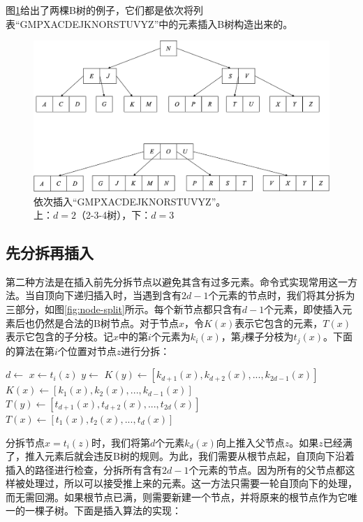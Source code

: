 \documentclass{ctexart}
\begin{document}
图\ref{fig:btree-insert-fp}给出了两棵B树的例子，它们都是依次将列表``GMPXACDEJKNORSTUVYZ''中的元素插入B树构造出来的。

\begin{figure}[htbp]
  \centering
  \includegraphics[scale=0.4]{img/btree-insert-fp.png}
  \captionsetup{justification=centering}
  \caption{依次插入``GMPXACDEJKNORSTUVYZ''。\\
上：$d = 2$（2-3-4树），下：$d = 3$}
  \label{fig:btree-insert-fp}
\end{figure}

\subsection{先分拆再插入}

第二种方法是在插入前先分拆节点以避免其含有过多元素。命令式实现常用这一方法。当自顶向下递归插入时，当遇到含有$2d - 1$个元素的节点时，我们将其分拆为三部分，如图\ref{fig:node-split}所示。每个新节点都只含有$d - 1$个元素，即使插入元素后也仍然是合法的B树节点。对于节点$x$，令$K(x)$表示它包含的元素，$T(x)$表示它包含的子分枝。记$x$中的第$i$个元素为$k_i(x)$，第$j$棵子分枝为$t_j(x)$。下面的算法在第$i$个位置对节点$z$进行分拆：

\begin{algorithmic}[1]
  \State $d \gets$ 
  \State $x \gets t_i(z)$
  \State $y \gets$ 
  \State $K(y) \gets [k_{d + 1}(x), k_{d + 2}(x), ..., k_{2d - 1}(x)]$
  \State $K(x) \gets [k_1(x), k_2(x), ..., k_{d-1}(x)]$
    \State $T(y) \gets [t_{d + 1}(x), t_{d + 2}(x), ..., t_{2d}(x)]$
    \State $T(x) \gets [t_1(x), t_2(x), ..., t_d(x)]$
  \EndIf
  \State {}
  \State {}
\EndProcedure
\end{algorithmic}

分拆节点$x = t_i(z)$时，我们将第$d$个元素$k_d(x)$向上推入父节点$z$。如果$z$已经满了，推入元素后就会违反B树的规则。为此，我们需要从根节点起，自顶向下沿着插入的路径进行检查，分拆所有含有$2d - 1$个元素的节点。因为所有的父节点都这样被处理过，所以可以接受推上来的元素。这一方法只需要一轮自顶向下的处理，而无需回溯。如果根节点已满，则需要新建一个节点，并将原来的根节点作为它唯一的一棵子树。下面是插入算法的实现：
\end{document}
